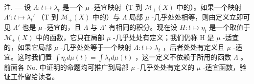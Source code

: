 注. --- 设 \(\Lambda: t \mapsto \lambda_{t}\) 是一个 \(\mu\) -适宜映射（T 到 \(\mathcal{M}_{+}(X)\) 中的）。如果一个映射 \(\Lambda': t \mapsto \lambda_{t}'\) （T 到 \(\mathcal{M}_{+}(X)\) 中的）与 \(\Lambda\) 局部 \(\mu\) -几乎处处相等，则由定义立即可见 \(\Lambda'\) 也是 \(\mu\) -适宜的，且 \(\Lambda\) 与 \(\Lambda'\) 有相同的积分。现在设 \(H: t \mapsto \eta_{t}\) 是一个取值于 \(\mathcal{M}_{+}(X)\) 中的函数，它只在局部 \(\mu\) -几乎处处有定义；我们仍称 H 是 \(\mu\) -适宜的，如果它局部 \(\mu\) -几乎处处等于一个映射 \(\Lambda: t \mapsto \lambda_{t}\) ，后者处处有定义且 \(\mu\) -适宜。这时我们置 \(\int \eta_{t} d\mu(t) = \int \lambda_{t} d\mu(t)\) ，这一定义不依赖于所用的函数 \(\Lambda\) 。前面各 No. 中证明的命题均可推广到局部 \(\mu\) -几乎处处有定义的 \(\mu\) -适宜函数，验证工作留给读者。

